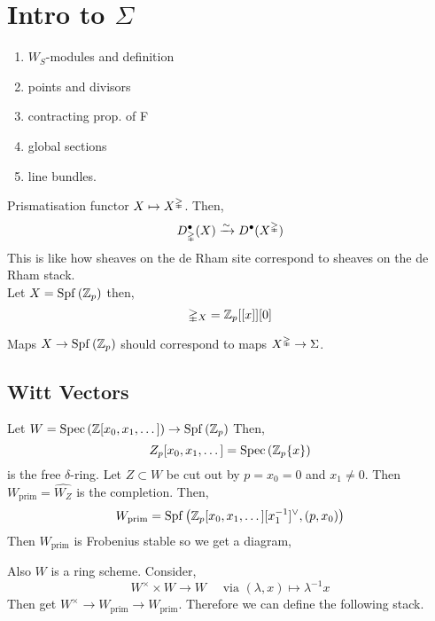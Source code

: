 \documentclass[12pt]{article}
\begin{document}
\section{Intro to $\Sigma$}

\begin{enumerate}
\item $W_S$-modules and definition

\item points and divisors 

\item contracting prop. of F

\item global sections

\item line bundles.
\end{enumerate}

Prismatisation functor $X \mapsto X^{\mathbb{\Delta}}$. Then,
\[ D_{\mathbb{\Delta}}^\bullet(X) \xrightarrow{\sim} D^\bullet(X^{\mathbb{\Delta}}) \]
This is like how sheaves on the de Rham site correspond to sheaves on the de Rham stack. 
\bigskip\\
Let $X = \mathrm{Spf}\left( \mathbb{Z}_p \right)$ then,
\[ \mathbb{\Delta}_{X} = \mathbb{Z}_p[[x]][0] \]

Maps $X \to \mathrm{Spf}\left( \mathbb{Z}_p \right)$ should correspond to maps $X^{\mathbb{\Delta}} \to \Sigma$.

\subsection{Witt Vectors}

\newcommand{\prim}{\mathrm{prim}}

Let $W = \mathrm{Spec}\left( \mathbb{Z}[x_0, x_1, \dots] \right) \to \mathrm{Spf}\left( \mathbb{Z}_p \right)$
Then,
\[ Z_p[x_0,x_1, \dots] = \mathrm{Spec}\left( \mathbb{Z}_p \{ x \} \right) \]
is the free $\delta$-ring. Let $Z \subset W$ be cut out by $p = x_0 = 0$ and $x_1 \neq 0$. Then $W_{\text{prim}} = \widehat{W_Z}$ is the completion. Then,
\[ W_{\prim} = \Spf{\Z_p[x_0,x_1, \dots][x_1^{-1}]^{\vee}, (p, x_0)} \]
Then $W_{\prim}$ is Frobenius stable so we get a diagram,
\begin{center}
\end{center}
Also $W$ is a ring scheme. Consider,
\[ W^\times \times W \to W \quad \text{ via } (\lambda, x) \mapsto \lambda^{-1} x \]
Then get $W^\times \to W_{\prim} \to W_{\prim}$. Therefore we can define the following stack.
\end{document}
